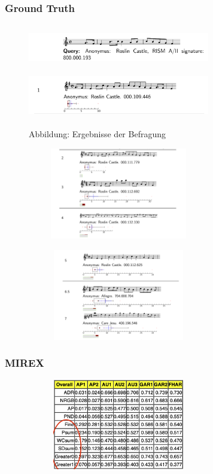 \documentclass{beamer}
\begin{document}
		\begin{frame}[allowframebreaks]
			\frametitle{Ground Truth}
				\begin{figure}[h!]
					\includegraphics[width=300px,height=75px,keepaspectratio]{ground_truth_query}
					\includegraphics[width=300px,height=75px,keepaspectratio]{ground_truth_results_one}
					\caption{Abbildung: Ergebnisse der Befragung \cite{three}}
				\end{figure}
				\begin{figure}[h!]
					\includegraphics[width=300px,height=150px,keepaspectratio]{ground_truth_results_two}
				\end{figure}
				\begin{figure}[h!]
					\includegraphics[width=300px,height=150px,keepaspectratio]{ground_truth_results_three}
				\end{figure}
		\end{frame}

	\begin{frame}
		\frametitle{MIREX}
		\begin{figure}[h!]
			\includegraphics[width=300px,height=150px,keepaspectratio]{mirex_result_example_change_two}
		\end{figure}
	\end{frame}
\end{document}
